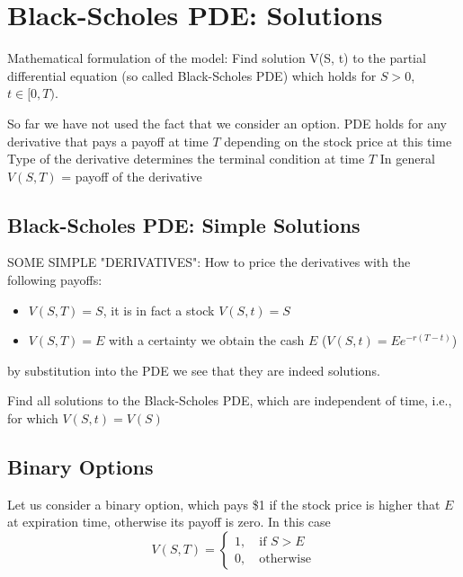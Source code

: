 \section{Black-Scholes PDE: Solutions}

Mathematical formulation of the model:
Find solution
V(S, t) to the partial differential equation (so called Black-Scholes PDE)
which holds for $S >0$, $t \in [0, T)$.

So far we have not used the fact that we consider an option. PDE holds for any derivative that pays a payoff at time $T$ depending on the stock price at this time
Type of the derivative determines the terminal condition at time $T$
In general $V(S, T)$ = payoff of the derivative 

\subsection{Black-Scholes PDE: Simple Solutions}
SOME SIMPLE "DERIVATIVES":
How to price the derivatives with the following payoffs:
\begin{itemize}
\tightlist
\item $V(S, T) = S$, it is in fact a stock $V(S, t) = S$
\item $V(S, T) = E$ with a certainty we obtain the cash $E$ ($V(S, t) = Ee^{−r(T−t)}$)
\end{itemize}
by substitution into the PDE we see that they are indeed solutions.


Find all solutions to the Black-Scholes PDE, which are independent of time, i.e., for which
$V(S, t) = V(S)$

\subsection{Binary Options}
Let us consider a binary option, which pays \$1 if the stock price is higher that $E$ at expiration time, otherwise its payoff is zero.
In this case
\begin{equation}
V(S, T) = 
	\begin{cases}
		1, \quad\textrm{if }S > E\\
		0, \quad\textrm{otherwise}	
	\end{cases}
\end{equation}


